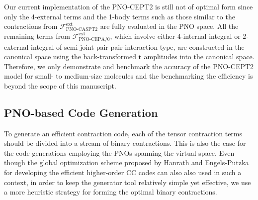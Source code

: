 \documentclass[aip,jcp,amsmath]{revtex4-1}
\begin{document}
%
Our current implementation of the PNO-CEPT2 is still not of optimal form since only the 4-external terms and the 1-body terms such as those similar to the contractions from $\mathscr{F}_\text{PNO-CASPT2}^\text{ext}$ are fully evaluated in the PNO space.
%
All the remaining terms from $\mathscr{F}_\text{PNO-CEPA/0}^\text{ext}$, which involve either 4-internal integral or 2-external integral of semi-joint pair-pair interaction type,\cite{neeseefficient2009cepa,neeseefficient2009} are constructed in the canonical space using the back-transformed $\mathbf{t}$ amplitudes into the canonical space.
%
Therefore, we only demonstrate and benchmark the accuracy of the PNO-CEPT2 model for small- to medium-size molecules and the benchmarking the efficiency is beyond the scope of this manuscript.

\subsection{PNO-based Code Generation}
%
To generate an efficient contraction code, each of the tensor contraction terms should be divided into a stream of binary contractions.
%
This is also the case for the code generations employing the PNOs spanning the virtual space.
%
Even though the global optimization scheme proposed by Hanrath and Engels-Putzka for developing the efficient higher-order CC codes\cite{hanrathan2010,engels-putzkaa2011} can also also used in such a context, in order to keep the generator tool relatively simple yet effective, we use a more heuristic strategy for forming the optimal binary contractions.
\end{document}
